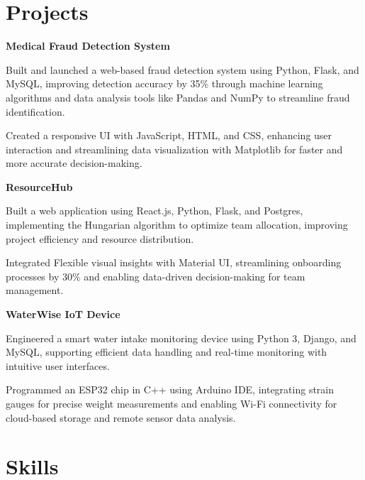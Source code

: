 \documentclass[letterpaper,10pt]{article}
\newcommand{\heading}[2]{
  \hspace{10pt}#1\hfill#2\\
}
\newcommand{\headingBf}[2]{
  \heading{\textbf{#1}}{\textbf{#2}}
}
\newenvironment{resume_list}{
  \vspace{-7pt}
  \begin{itemize}[itemsep=-2px, parsep=1pt, leftmargin=30pt]
}{
  \end{itemize}
}
\begin{document}

  \section{Projects}

  \headingBf{Medical Fraud Detection System}{}
  \begin{resume_list}
    \item Built and launched a web-based fraud detection system using Python, Flask, and MySQL, improving
    detection accuracy by 35\% through machine learning algorithms and data analysis tools like Pandas and
    NumPy to streamline fraud identification.
    \item Created a responsive UI with JavaScript, HTML, and CSS, enhancing user interaction and streamlining data
    visualization with Matplotlib for faster and more accurate decision-making.
  \end{resume_list}

  \headingBf{ResourceHub}{}
  \begin{resume_list}
    \item Built a web application using React.js, Python, Flask, and Postgres, implementing the Hungarian algorithm
    to optimize team allocation, improving project efficiency and resource distribution.
    \item Integrated Flexible visual insights with Material UI, streamlining onboarding processes by 30\% and
    enabling data-driven decision-making for team management.
  \end{resume_list}

   \headingBf{WaterWise IoT Device}{}
  \begin{resume_list}
    \item Engineered a smart water intake monitoring device using Python 3, Django, and MySQL, supporting efficient
    data handling and real-time monitoring with intuitive user interfaces.
    \item Programmed an ESP32 chip in C++ using Arduino IDE, integrating strain gauges for precise weight
    measurements and enabling Wi-Fi connectivity for cloud-based storage and remote sensor data analysis.
  \end{resume_list}

  

  \section{Skills}
\end{document}
